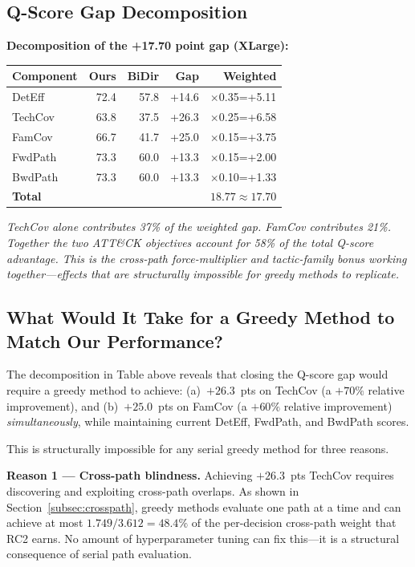 \documentclass[journal]{IEEEtran}
\begin{document}
\subsection{Q-Score Gap Decomposition}

\begin{examplebox}
\textbf{Decomposition of the +17.70 point gap (XLarge):}
\begin{center}
\small\renewcommand{\arraystretch}{1.15}
\begin{tabular}{@{}lrrrr@{}}
\toprule
\textbf{Component}&\textbf{Ours}&\textbf{BiDir}&
\textbf{Gap}&\textbf{Weighted}\\
\midrule
DetEff  &72.4&57.8&+14.6&$\times$0.35=+5.11\\
TechCov &63.8&37.5&+26.3&$\times$0.25=+6.58\\
FamCov  &66.7&41.7&+25.0&$\times$0.15=+3.75\\
FwdPath &73.3&60.0&+13.3&$\times$0.15=+2.00\\
BwdPath &73.3&60.0&+13.3&$\times$0.10=+1.33\\
\midrule
\textbf{Total}&&&&$\mathbf{18.77\approx17.70}$\\
\bottomrule
\end{tabular}
\end{center}
\textit{TechCov alone contributes 37\% of the weighted gap.
FamCov contributes 21\%.
Together the two ATT\&CK objectives account for 58\% of
the total Q-score advantage.
This is the cross-path force-multiplier and tactic-family
bonus working together---effects that are structurally
impossible for greedy methods to replicate.}
\end{examplebox}


\subsection{What Would It Take for a Greedy Method to Match Our Performance?}
\label{subsec:greedy_gap}

The decomposition in Table above reveals that closing the
Q-score gap would require a greedy method to achieve:
(a)~$+26.3$~pts on TechCov (a $+70\%$ relative improvement),
and (b)~$+25.0$~pts on FamCov (a $+60\%$ relative improvement)
\emph{simultaneously}, while maintaining current DetEff, FwdPath,
and BwdPath scores.

This is structurally impossible for any serial greedy method
for three reasons.

\textbf{Reason 1 --- Cross-path blindness.}
Achieving $+26.3$~pts TechCov requires discovering
and exploiting cross-path overlaps.
As shown in Section~\ref{subsec:crosspath}, greedy methods
evaluate one path at a time and can achieve at most
$1.749/3.612 = 48.4\%$ of the per-decision cross-path
weight that RC2 earns.
No amount of hyperparameter tuning can fix this---it is a
structural consequence of serial path evaluation.
\end{document}
